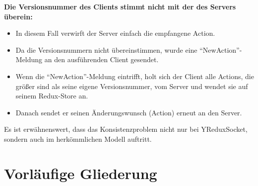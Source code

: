 \documentclass[12pt]{article} %
\begin{document}
\textbf{Die Versionsnummer des Clients stimmt nicht mit der des Servers überein:}

\begin{itemize}
    \item In diesem Fall verwirft der Server einfach die empfangene Action.
    \item Da die Versionsnummern nicht übereinstimmen, wurde eine "`NewAction"'-Meldung an den ausführenden Client gesendet.
    \item Wenn die "`NewAction"'-Meldung eintrifft, holt sich der Client alle Actions, die größer sind als seine eigene Versionsnummer, vom Server und wendet sie auf seinem Redux-Store an.
    \item Danach sendet er seinen Änderungswunsch (Action) erneut an den Server.
\end{itemize}

Es ist erwähnenswert, dass das Konsistenzproblem nicht nur bei YReduxSocket, sondern auch im herkömmlichen Modell auftritt.

\section{Vorläufige Gliederung}
\end{document}
